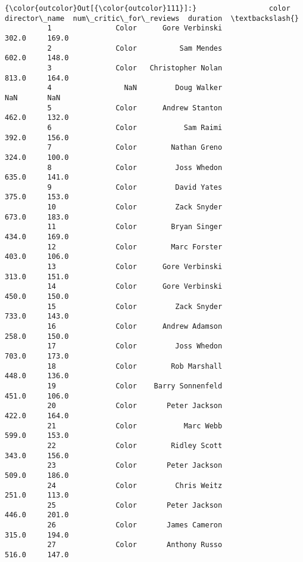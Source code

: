 \documentclass[11pt]{article}
\begin{document}
\begin{Verbatim}[commandchars=\\\{\}]
{\color{outcolor}Out[{\color{outcolor}111}]:}                 color       director\_name  num\_critic\_for\_reviews  duration  \textbackslash{}
          1               Color      Gore Verbinski                   302.0     169.0   
          2               Color          Sam Mendes                   602.0     148.0   
          3               Color   Christopher Nolan                   813.0     164.0   
          4                 NaN         Doug Walker                     NaN       NaN   
          5               Color      Andrew Stanton                   462.0     132.0   
          6               Color           Sam Raimi                   392.0     156.0   
          7               Color        Nathan Greno                   324.0     100.0   
          8               Color         Joss Whedon                   635.0     141.0   
          9               Color         David Yates                   375.0     153.0   
          10              Color         Zack Snyder                   673.0     183.0   
          11              Color        Bryan Singer                   434.0     169.0   
          12              Color        Marc Forster                   403.0     106.0   
          13              Color      Gore Verbinski                   313.0     151.0   
          14              Color      Gore Verbinski                   450.0     150.0   
          15              Color         Zack Snyder                   733.0     143.0   
          16              Color      Andrew Adamson                   258.0     150.0   
          17              Color         Joss Whedon                   703.0     173.0   
          18              Color        Rob Marshall                   448.0     136.0   
          19              Color    Barry Sonnenfeld                   451.0     106.0   
          20              Color       Peter Jackson                   422.0     164.0   
          21              Color           Marc Webb                   599.0     153.0   
          22              Color        Ridley Scott                   343.0     156.0   
          23              Color       Peter Jackson                   509.0     186.0   
          24              Color         Chris Weitz                   251.0     113.0   
          25              Color       Peter Jackson                   446.0     201.0   
          26              Color       James Cameron                   315.0     194.0   
          27              Color       Anthony Russo                   516.0     147.0   

\end{Verbatim}
\end{document}
